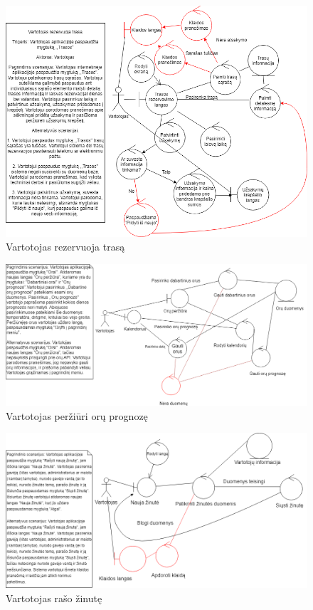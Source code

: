 \documentclass[oneside]{VUMIFPSkursinis}
\begin{document}
			\begin{figure}[h]
    				\centering
    				\includegraphics[width=1\textwidth]{rob8.png}
    				\caption{Vartotojas rezervuoja trasą}
    				\label{fig:VartotojoUseCasel}
			\end{figure}

			\begin{figure}[h]
    				\centering
    				\includegraphics[width=1\textwidth]{rob10.png}
    				\caption{Vartotojas peržiūri orų prognozę}
    				\label{fig:Vartotojas peržiūri orų prognozę}
			\end{figure}

			\begin{figure}[h]
    				\centering
    				\includegraphics[width=1\textwidth]{rob11.png}
    				\caption{Vartotojas rašo žinutę}
    				\label{fig:Vartotojas rašo žinutę}
			\end{figure}
\end{document}
